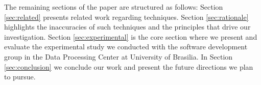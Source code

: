 

The remaining sections of the paper are structured as follows: Section \ref{sec:related} presents related work regarding  techniques. Section \ref{sec:rationale} highlights the inaccuracies of such techniques and the principles that drive our investigation. Section \ref{sec:experimental} is the core section where we present and evaluate the experimental study we conducted with the software development group in the Data Processing Center at University of Brasilia. In Section \ref{sec:conclusion} we conclude our work and present the future directions we plan to pursue.


